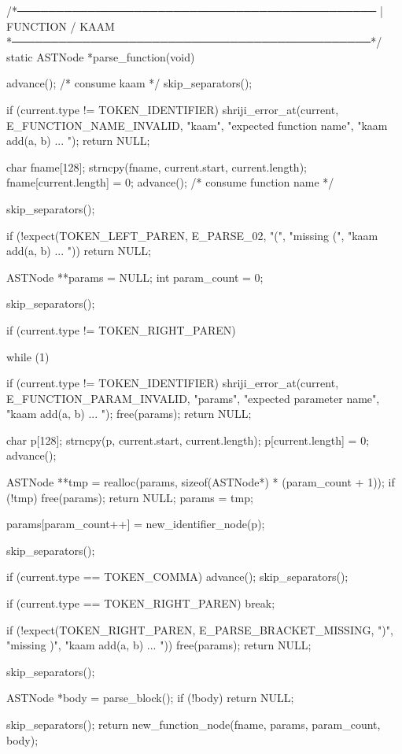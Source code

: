 \documentclass{article}
\begin{document}
/*──────────────────────────────────────────────
 | FUNCTION / KAAM
 *──────────────────────────────────────────────*/
static ASTNode *parse_function(void)
{
    advance(); /* consume kaam */
    skip_separators();

    if (current.type != TOKEN_IDENTIFIER) {
        shriji_error_at(current, E_FUNCTION_NAME_INVALID, "kaam", "expected function name",
                        "kaam add(a, b) { ... }");
        return NULL;
    }

    char fname[128];
    strncpy(fname, current.start, current.length);
    fname[current.length] = 0;
    advance(); /* consume function name */

    skip_separators();

    if (!expect(TOKEN_LEFT_PAREN, E_PARSE_02, "(", "missing (",
                "kaam add(a, b) { ... }"))
        return NULL;

    ASTNode **params = NULL;
    int param_count = 0;

    skip_separators();

    if (current.type != TOKEN_RIGHT_PAREN) {
        while (1) {

            if (current.type != TOKEN_IDENTIFIER) {
                shriji_error_at(current, E_FUNCTION_PARAM_INVALID, "params",
                                "expected parameter name",
                                "kaam add(a, b) { ... }");
                free(params);
                return NULL;
            }

            char p[128];
            strncpy(p, current.start, current.length);
            p[current.length] = 0;
            advance();

            ASTNode **tmp = realloc(params, sizeof(ASTNode*) * (param_count + 1));
            if (!tmp) {
                free(params);
                return NULL;
            }
            params = tmp;

            params[param_count++] = new_identifier_node(p);

            skip_separators();

            if (current.type == TOKEN_COMMA) {
                advance();
                skip_separators();
            }

            if (current.type == TOKEN_RIGHT_PAREN)
                break;
        }
    }

    if (!expect(TOKEN_RIGHT_PAREN, E_PARSE_BRACKET_MISSING, ")", "missing )",
                "kaam add(a, b) { ... }")) {
        free(params);
        return NULL;
    }

    skip_separators();

    ASTNode *body = parse_block();
    if (!body) return NULL;

    skip_separators();
    return new_function_node(fname, params, param_count, body);
}
\end{document}
